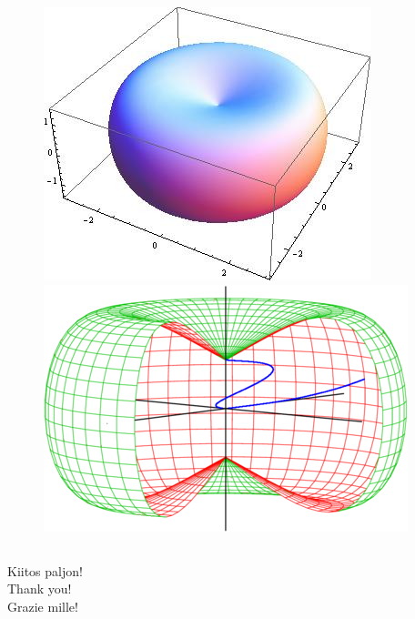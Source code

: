 \documentclass[serif]{beamer}
\theoremstyle{definition}
\begin{document}

\begin{frame}{}
\begin{figure}[!ht]
\centering
{\includegraphics[width=5.3 cm]{CCSphere.jpg}}
{\includegraphics[width=5.3 cm]{O6NE6.png}}
\end{figure}
\end{frame}


\subsection{}
\begin{frame}
\begin{center}
\huge{Kiitos paljon!}\\
\huge{Thank you!}\\
\huge{Grazie mille!}
\end{center}
\end{frame}
\end{document}
